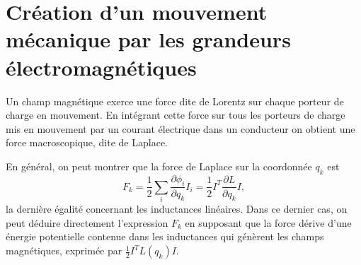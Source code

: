 \section{Création d'un mouvement mécanique par les grandeurs électromagnétiques} 

Un champ magnétique exerce une force dite de Lorentz sur chaque porteur de charge en mouvement. En intégrant cette force sur tous les porteurs de charge mis en mouvement par un courant électrique dans un conducteur on obtient une force macroscopique, dite de Laplace.  





En général, on peut montrer que la force de Laplace sur la coordonnée $q_k$ est 
\begin{equation}
F_k=\frac{1}{2}\sum_i \frac{\partial \phi_i}{\partial q_k}  I_i = \frac{1}{2} I^T \frac{\partial L}{\partial q_k} I,
\label{eq:Lorentz}
\end{equation}
la dernière égalité concernant les inductances linéaires. Dans ce dernier cas, on peut déduire directement l'expression $F_k$  en supposant que la force dérive d'une énergie potentielle contenue dans les inductances qui génèrent les champs magnétiques, exprimée par $\frac{1}{2} I^T L(q_k) I$.




